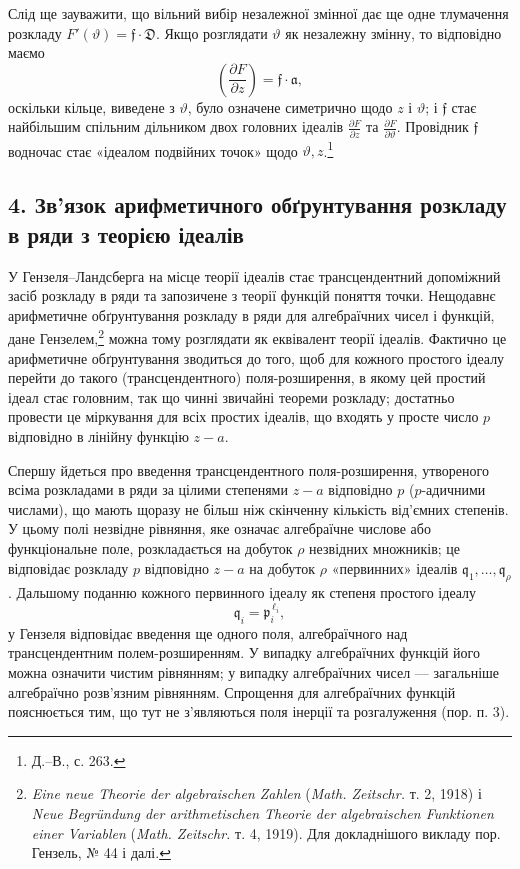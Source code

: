 \documentclass[11pt]{article}
\providecommand{\p}{\partial}
\providecommand{\frD}{\mathfrak D}
\providecommand{\frf}{\mathfrak f}
\providecommand{\fra}{\mathfrak a}
\providecommand{\frp}{\mathfrak p}
\begin{document}
Слід ще зауважити, що вільний вибір незалежної змінної дає ще одне тлумачення розкладу \(F'(\vartheta)=\frf\cdot\frD\). Якщо розглядати \(\vartheta\) як незалежну змінну, то відповідно маємо
\[
\left(\frac{\p F}{\p z}\right)=\frf\cdot\fra,
\]
оскільки кільце, виведене з \(\vartheta\), було означене симетрично щодо \(z\) і \(\vartheta\); і \(\frf\) стає найбільшим спільним дільником двох головних ідеалів \(\frac{\p F}{\p z}\) та \(\frac{\p F}{\p\vartheta}\). Провідник \(\frf\) водночас стає «ідеалом подвійних точок» щодо \(\vartheta,z\).\footnote{Д.--В., с. 263.}

\subsection*{4. Зв'язок арифметичного обґрунтування розкладу в ряди з теорією ідеалів}
У Гензеля--Ландсберга на місце теорії ідеалів стає трансцендентний допоміжний засіб розкладу в ряди та запозичене з теорії функцій поняття точки. Нещодавнє арифметичне обґрунтування розкладу в ряди для алгебраїчних чисел і функцій, дане Гензелем,\footnote{\emph{Eine neue Theorie der algebraischen Zahlen} (\emph{Math. Zeitschr.} т. 2, 1918) і \emph{Neue Begründung der arithmetischen Theorie der algebraischen Funktionen einer Variablen} (\emph{Math. Zeitschr.} т. 4, 1919). Для докладнішого викладу пор. Гензель, № 44 і далі.} можна тому розглядати як еквівалент теорії ідеалів. Фактично це арифметичне обґрунтування зводиться до того, щоб для кожного простого ідеалу перейти до такого (трансцендентного) поля-розширення, в якому цей простий ідеал стає головним, так що чинні звичайні теореми розкладу; достатньо провести це міркування для всіх простих ідеалів, що входять у просте число \(p\) відповідно в лінійну функцію \(z-a\).

Спершу йдеться про введення трансцендентного поля-розширення, утвореного всіма розкладами в ряди за цілими степенями \(z-a\) відповідно \(p\) (\(p\)-адичними числами), що мають щоразу не більш ніж скінченну кількість від'ємних степенів. У цьому полі незвідне рівняння, яке означає алгебраїчне числове або функціональне поле, розкладається на добуток \(\rho\) незвідних множників; це відповідає розкладу \(p\) відповідно \(z-a\) на добуток \(\rho\) «первинних» ідеалів \(\mathfrak q_1,\ldots,\mathfrak q_\rho\). Дальшому поданню кожного первинного ідеалу як степеня простого ідеалу
\[
\mathfrak q_i=\frp_i^{\,\ell_i},
\]
у Гензеля відповідає введення ще одного поля, алгебраїчного над трансцендентним полем-розширенням. У випадку алгебраїчних функцій його можна означити чистим рівнянням; у випадку алгебраїчних чисел --- загальніше алгебраїчно розв'язним рівнянням. Спрощення для алгебраїчних функцій пояснюється тим, що тут не з'являються поля інерції та розгалуження (пор. п. 3).
\end{document}
